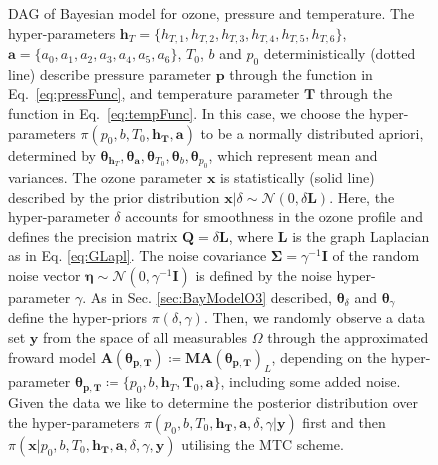 \begin{figure}[thb!]
	\caption[Directed acyclic graph of Bayesian model for ozone, pressure and temperature.]{DAG of Bayesian model for ozone, pressure and temperature. The hyper-parameters $\bm{h}_T= \{ h_{T,1}, h_{T,2},h_{T,3},h_{T,4},h_{T,5},h_{T,6}\}$, $\bm{a} = \{ a_0, a_1, a_2,a_3,a_4,a_5,a_6\}$, $T_0$, $b$ and $p_0$ deterministically (dotted line) describe pressure parameter $\bm{p}$ through the function in Eq.~\ref{eq:pressFunc}, and temperature parameter $\bm{T}$ through the function in Eq.~\ref{eq:tempFunc}.
	In this case, we choose the hyper-parameters $\pi(p_0,b,T_0,\bm{h_T},\bm{a})$ to be a normally distributed apriori, determined by $\bm{\theta}_{\bm{h}_T},\bm{\theta}_{\bm{a}}, \bm{\theta}_{T_{0}},\bm{\theta}_{b} , \bm{\theta}_{p_0}$, which represent mean and variances. 
	The ozone parameter $\bm{x}$ is statistically (solid line) described by the prior distribution $\bm{x}| \delta \sim \mathcal{N}(0,\delta \bm{L}) $. 
	Here, the hyper-parameter $\delta$ accounts for smoothness in the ozone profile and defines the precision matrix $\bm{Q} = \delta \bm{L}$, where $\bm{L}$ is the graph Laplacian as in Eq. \ref{eq:GLapl}.
	The noise covariance $\bm{\Sigma} = \gamma^{-1} \bm{I}$ of the random noise vector $\bm{\eta} \sim \mathcal{N}(0,\gamma^{-1} \bm{I} ) $ is defined by the noise hyper-parameter $\gamma$.
	As in Sec. \ref{sec:BayModelO3} described, $\bm{\theta}_{\delta}$ and $\bm{\theta}_{\gamma}$ define the hyper-priors $\pi(\delta, \gamma)$.
	Then, we randomly observe a data set $\bm{y}$ from the space of all measurables $\Omega$ through the approximated froward model $\bm{A}(\bm{\theta}_{\bm{p}, \bm{T}}) \coloneqq \bm{M}\bm{A}(\bm{\theta}_{\bm{p}, \bm{T}})_L$, depending on the hyper-parameter $\bm{\theta}_{\bm{p}, \bm{T}}  \coloneqq \{p_0, b, \bm{h}_T, \bm{T}_0, \bm{a} \}$, including some added noise.
	Given the data we like to determine the posterior distribution over the hyper-parameters $\pi(p_0,b,T_0,\bm{h_T},\bm{a}, \delta, \gamma | \bm{y})$ first and then $\pi(\bm{x}|p_0,b,T_0,\bm{h_T},\bm{a}, \delta, \gamma, \bm{y})$ utilising the MTC scheme.}
	\label{fig:DAGComplete}
\end{figure}

